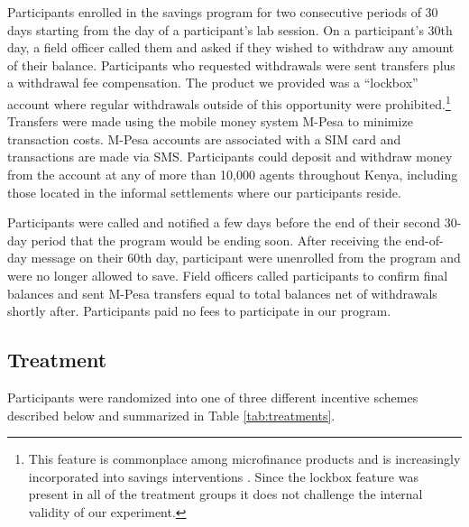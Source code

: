 \documentclass[11pt]{article}
\begin{document}
		Participants enrolled in the savings program for two consecutive periods of 30 days starting from the day of a participant's lab session. On a participant's 30th day, a field officer called them and asked if they wished to withdraw any amount of their balance. Participants who requested withdrawals were sent transfers plus a withdrawal fee compensation. The product we provided was a ``lockbox'' account where regular withdrawals outside of this opportunity were prohibited.\footnote{This feature is commonplace among microfinance products and is increasingly incorporated into savings interventions \parencite{ashraf_review_2003}. Since the lockbox feature was present in all of the treatment groups it does not challenge the internal validity of our experiment.} Transfers were made using the mobile money system M-Pesa to minimize transaction costs. M-Pesa accounts are associated with a SIM card and transactions are made via SMS. Participants could deposit and withdraw money from the account at any of more than 10,000 agents throughout Kenya, including those located in the informal settlements where our participants reside.

		Participants were called and notified a few days before the end of their second 30-day period that the program would be ending soon. After receiving the end-of-day message on their 60th day, participant were unenrolled from the program and were no longer allowed to save. Field officers called participants to confirm final balances and sent M-Pesa transfers equal to total balances net of withdrawals shortly after. Participants paid no fees to participate in our program.

	\subsection{Treatment} \label{sec:treat}

		Participants were randomized into one of three different incentive schemes described below and summarized in Table \ref{tab:treatments}.
\end{document}
